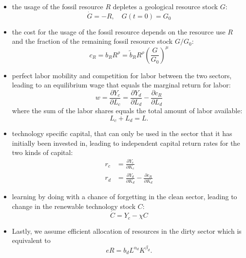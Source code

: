 \begin{itemize}
	\item the usage of the fossil resource $R$ depletes a geological resource stock $G$:
		\begin{equation}
			\dot{G} = -R, \quad G(t=0) = G_0
			\label{eq:resource_depletion}
		\end{equation}
	\item the cost for the usage of the fossil resource depends on the resource use $R$ and the fraction of the remaining fossil resource stock $G/G_0$:
		\begin{equation}
			c_R = b_R R^{\rho} = \tilde{b}_R R^{\rho}\left( \frac{G}{G_0} \right)^{\mu}
			\label{eq:resource_cost}
		\end{equation}
	\item perfect labor mobility and competition for labor between the two sectors, leading to an equilibrium wage that equals the marginal return for labor:
		\begin{equation}
			w = \frac{\partial Y_c}{\partial L_c} = \frac{\partial Y_d}{\partial L_d} - \frac{\partial c_R}{\partial L_d}
			\label{eq:equilibrium_wage}
		\end{equation}
		where the sum of the labor shares equals the total amount of labor available:
		\begin{equation}
			L_c + L_d = L.
			\label{eq:population}
		\end{equation}

	\item technology specific capital, that can only be used in the sector that it has initially been invested in, leading to independent capital return rates for the two kinds of capital:
		\begin{align}
			r_c &= \frac{\partial Y_c}{\partial K_c} \label{eq:clean_capital_rent}\\
			r_d &= \frac{\partial Y_d}{\partial K_d} - \frac{\partial c_R}{\partial K_d} \label{eq:dirty_capital_rent}
		\end{align}
	\item learning by doing with a chance of forgetting in the clean sector, leading to change in the renewable technology stock $C$:
		\begin{equation}
			\dot{C} = Y_c - \chi C
			\label{learning_by_doing}
		\end{equation}
	\item Lastly, we assume efficient allocation of resources in the dirty sector which is equivalent to
		\begin{equation}
			e R = b_d L^{\alpha_d}K^{\beta_d}.
			\label{eq:resources}
		\end{equation}
\end{itemize}


